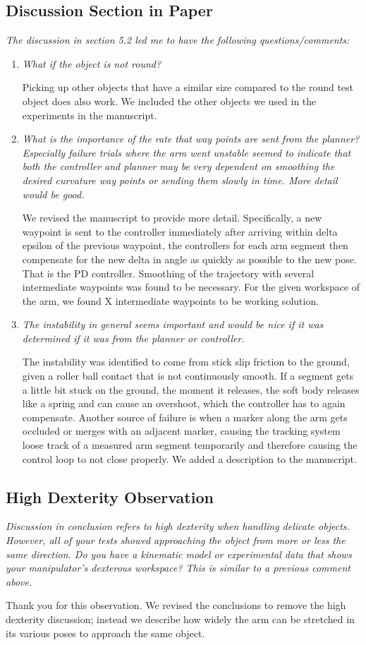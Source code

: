 \documentclass[letterpaper, 10 pt, twocolumn, conference]{article}
\begin{document}
\subsection{Discussion Section in Paper}
\textit{The discussion in section 5.2 led me to have the following questions/comments:}
\begin{enumerate}
\item \textit{What if the object is not round?}

Picking up other objects that have a similar size compared to the round test object does also work. We included the other objects we used in the experiments in the manuscript. 

\item \textit{What is the importance of the rate that way points are sent from the planner? Especially failure trials where the arm went unstable seemed to indicate that both the controller and planner may be very dependent on smoothing the desired curvature way points or sending them slowly in time. More detail would be good.}

We revised the manuscript to provide more detail. Specifically, a new waypoint is sent to the controller immediately after arriving within delta epsilon of the previous waypoint, the controllers for each arm segment then compensate for the new delta in angle as quickly as possible to the new pose. That is the PD controller. Smoothing of the trajectory with several intermediate waypoints was found to be necessary. For the given workspace of the arm, we found X intermediate waypoints to be working solution.

\item \textit{ The instability in general seems important and would be nice if it was determined if it was from the planner or controller.}

The instability was identified to come from stick slip friction to the ground, given a roller ball contact that is not continuously smooth. If a segment gets a little bit stuck on the ground, the moment it releases, the soft body releases like a spring and can cause an overshoot, which the controller has to again compensate. Another source of failure is when a marker along the arm gets occluded or merges with an adjacent marker, causing the tracking system loose track of a measured arm segment temporarily and therefore causing the control loop to not close properly. We added a description to the manuscript. 
\end{enumerate}

\subsection{High Dexterity Observation}
\textit{Discussion in conclusion refers to high dexterity when handling delicate objects. However, all of your tests showed approaching the object from more or less the same direction. Do you have a kinematic model or experimental data that shows your manipulator's dexterous workspace? This is similar to a previous comment above.}

Thank you for this observation. We revised the conclusions to remove the high dexterity discussion; instead we describe how widely the arm can be stretched in its various poses to approach the same object. 
\end{document}
